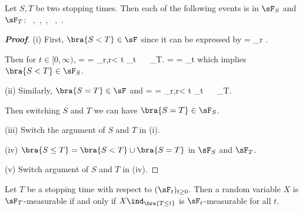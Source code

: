 \begin{proposition}
Let $S,T$ be two stopping times. Then each of the following events is in $\sF_S$ and $\sF_T$:
\be
{}\ ,\quad{}\ ,\quad {}\ , \quad {}\  ,\quad{}\ .
\ee
\end{proposition}

\begin{proof}[\bf Proof]
\ben
\item [(i)] First, $\bra{S<T}\in \sF$ since it can be expressed by 
\be
{} = \bigcup_{r\in \Q} .
\ee

Then for $t\in [0,\infty)$,
\be
{} \cap {} =  = \bigcup_{r\in \Q,r< t} \cap {} \in \sF_t \ \ra \   \in \sF_T.
\ee
\be
{} \cap {} =   \cup {} =  \cup {} \in \sF_t \nonumber
\ee
which implies $\bra{S<T}  \in \sF_S$.

\item [(ii)] Similarly, $\bra{S=T}\in \sF$ and 
\be
{}\cap {} =  = \bigcup_{r\in \Q,r< t} \cap {} \in \sF_t \ \ra \   \in \sF_T.
\ee

Then switching $S$ and $T$ we can have $\bra{S=T}  \in \sF_S$.

\item [(iii)] Switch the argument of $S$ and $T$ in (i).

\item [(iv)] $\bra{S\leq T} = \bra{S<T}\cup\bra{S=T}$ in $\sF_S$ and $\sF_T$.
\item [(v)] Switch argument of $S$ and $T$ in (iv).
\een
\end{proof}


\begin{proposition}\label{pro:random_variable_stopping_time_measurable}
Let $T$ be a stopping time with respect to $(\sF_t)_{t\geq 0}$. Then a random variable $X$ is $\sF_T$-measurable if and only if $X\ind_{\bra{T \leq t}}$ is $\sF_t$-measurable for all $t$.
\end{proposition}

